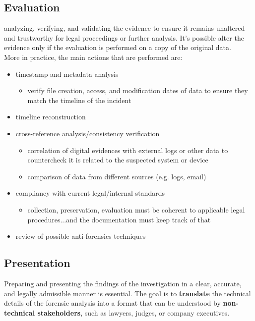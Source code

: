 \subsection{Evaluation}
analyzing, verifying, and validating the evidence to ensure it remains unaltered and trustworthy for legal proceedings or further analysis. It's possible alter the evidence only if the evaluation is performed on a copy of the original data. \\
More in practice, the main actions that are performed are:
\begin{itemize}[itemsep=0pt]
  \item timestamp and metadata analysis
    \begin{itemize}
      \item verify file creation, access, and modification dates of data to ensure they match the timeline of the incident
    \end{itemize}
  \item timeline reconstruction
  \item cross-reference analysis/consistency verification
    \begin{itemize}
      \item correlation of digital evidences with external logs or other data to countercheck it is related to the suspected system or device
      \item comparison of data from different sources (e.g. logs, email)
    \end{itemize}
  \item compliancy with current legal/internal standards
    \begin{itemize}
      \item collection, preservation, evaluation must be coherent to applicable legal procedures...and the documentation must keep track of that
    \end{itemize}
  \item review of possible anti-forensics techniques
\end{itemize}

\subsection{Presentation}
Preparing and presenting the findings of the investigation in a clear, accurate, and legally admissible manner is essential. The goal is to \textbf{translate} the technical details of the forensic analysis into a format that can be understood by \textbf{non-technical stakeholders}, such as lawyers, judges, or company executives.

